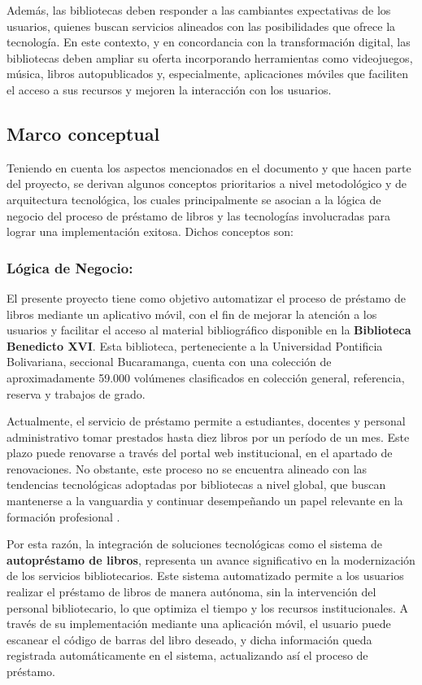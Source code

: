 \documentclass[spanish]{ieee_upb}
\begin{document}
Además, las bibliotecas deben responder a las cambiantes expectativas de los usuarios, quienes buscan servicios alineados con las posibilidades que ofrece la tecnología. En este contexto, y en concordancia con la transformación digital, las bibliotecas deben ampliar su oferta incorporando herramientas como videojuegos, música, libros autopublicados y, especialmente, aplicaciones móviles que faciliten el acceso a sus recursos y mejoren la interacción con los usuarios.\cite{gomez2015biblioteca}

\subsection{Marco conceptual}
Teniendo en cuenta los aspectos mencionados en el documento y que hacen parte del proyecto, se derivan algunos conceptos prioritarios a nivel metodológico y de arquitectura tecnológica, los cuales principalmente se asocian a la lógica de negocio del proceso de préstamo de libros y las tecnologías involucradas para lograr una implementación exitosa. Dichos conceptos son:


\subsubsection{Lógica de Negocio: }El presente proyecto tiene como objetivo automatizar el proceso de préstamo de libros mediante un aplicativo móvil, con el fin de mejorar la atención a los usuarios y facilitar el acceso al material bibliográfico disponible en la \textbf{Biblioteca Benedicto XVI}. Esta biblioteca, perteneciente a la Universidad Pontificia Bolivariana, seccional Bucaramanga, cuenta con una colección de aproximadamente 59.000 volúmenes clasificados en colección general, referencia, reserva y trabajos de grado.\vspace{0.3 cm}

Actualmente, el servicio de préstamo permite a estudiantes, docentes y personal administrativo tomar prestados hasta diez libros por un período de un mes. Este plazo puede renovarse a través del portal web institucional, en el apartado de renovaciones. No obstante, este proceso no se encuentra alineado con las tendencias tecnológicas adoptadas por bibliotecas a nivel global, que buscan mantenerse a la vanguardia y continuar desempeñando un papel relevante en la formación profesional \cite{rodriguez2015automatizacion}.\vspace{0.3 cm}

Por esta razón, la integración de soluciones tecnológicas como el sistema de \textbf{autopréstamo de libros}, representa un avance significativo en la modernización de los servicios bibliotecarios. Este sistema automatizado permite a los usuarios realizar el préstamo de libros de manera autónoma, sin la intervención del personal bibliotecario, lo que optimiza el tiempo y los recursos institucionales. A través de su implementación mediante una aplicación móvil, el usuario puede escanear el código de barras del libro deseado, y dicha información queda registrada automáticamente en el sistema, actualizando así el proceso de préstamo.\vspace{0.3 cm}
\end{document}
